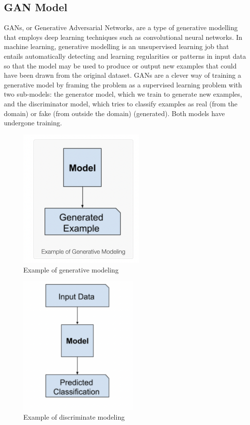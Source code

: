 \subsection{GAN Model}
	
\par	GANs, or Generative Adversarial Networks, are a type of generative modelling that employs deep learning techniques such as convolutional neural networks. In machine learning, generative modelling is an unsupervised learning job that entails automatically detecting and learning regularities or patterns in input data so that the model may be used to produce or output new examples that could have been drawn from the original dataset. GANs are a clever way of training a generative model by framing the problem as a supervised learning problem with two sub-models: the generator model, which we train to generate new examples, and the discriminator model, which tries to classify examples as real (from the domain) or fake (from outside the domain) (generated). Both models have undergone training.

	
	\begin{figure}[h!]
    \centering
    \includegraphics[width=\linewidth,height=7cm]{figures/3.png}
    \caption{ Example of generative modeling}
    \label{fig:GAN model}
\end{figure}



	\begin{figure}[h!]
    \centering
    \includegraphics[width=\linewidth,height=7cm]{figures/4.png}
    \caption{  Example of discriminate modeling}
    \label{fig:GAN model}
\end{figure}



